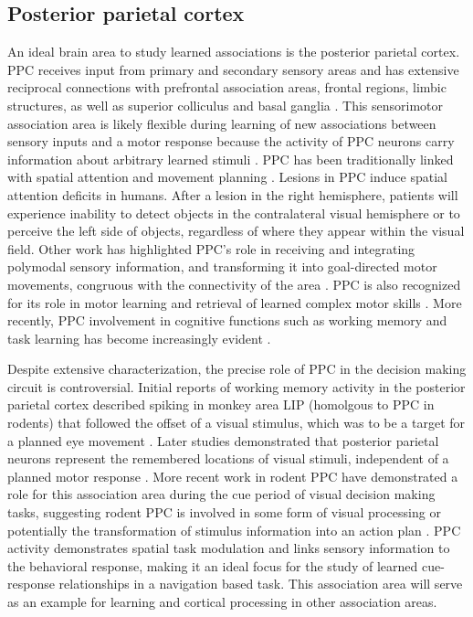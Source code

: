 \subsection{Posterior parietal cortex}\label{methods:ppc}
An ideal brain area to study learned associations is the posterior parietal cortex. PPC receives input from primary and secondary sensory areas and has extensive reciprocal connections with prefrontal association areas, frontal regions, limbic structures, as well as superior colliculus and basal ganglia \citep{Harvey:2012du, Constantinidis2004}. This sensorimotor association area is likely flexible during learning of new associations between sensory inputs and a motor response because the activity of PPC neurons carry information about arbitrary learned stimuli \citep{Freedman2009}. PPC has been traditionally linked with spatial attention and movement planning \citep{Bisley2010, Andersen2009}. Lesions in PPC induce spatial attention deficits in humans. After a lesion in the right hemisphere, patients will experience inability to detect objects in the contralateral visual hemisphere or to perceive the left side of objects, regardless of where they appear within the visual field. Other work has highlighted PPC's role in receiving and integrating polymodal sensory information, and transforming it into goal-directed motor movements, congruous with the connectivity of the area \citep{Seal1989, Stricanne1996, Batista1999}. PPC is also recognized for its role in motor learning and retrieval of learned complex motor skills  \citep{Gallese1994, Goodale1992, Haaland2000, Rushworth1998}. More recently, PPC involvement in cognitive functions such as working memory and task learning has become increasingly evident \citep{Rawley2009}.

\bigskip

Despite extensive characterization, the precise role of PPC in the decision making circuit is controversial. Initial reports of working memory activity in the posterior parietal cortex described spiking in monkey area LIP (homolgous to PPC in rodents) that followed the offset of a visual stimulus, which was to be a target for a planned eye movement \citep{Barash1991}. Later studies demonstrated that posterior parietal neurons represent the remembered locations of visual stimuli, independent of a planned motor response \citep{Freedman2009, Constantinidis1996, Berryhill2008}. More recent work in rodent PPC have demonstrated a role for this association area during the cue period of visual decision making tasks, suggesting rodent PPC is involved in some form of visual processing or potentially the transformation of stimulus information into an action plan \citep{Licata2016, Goard2016, Raposo2014}. PPC activity demonstrates spatial task modulation and links sensory information to the behavioral response, making it an ideal focus for the study of learned cue-response relationships in a navigation based task. This association area will serve as an example for learning and cortical processing in other association areas.

